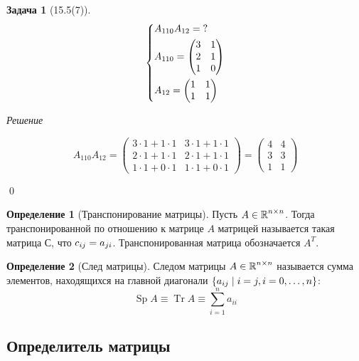 \documentclass[a4paper,12pt]{article}
\newtheorem*{problem}{Задача}
\theoremstyle{definition}
\newtheorem{definition}{Определение}[section]
\theoremstyle{remark}
\theoremstyle{remark}
\DeclareMathOperator{\Sp}{Sp}
\DeclareMathOperator{\Tr}{Tr}
\begin{document}
  \begin{problem}[15.5(7)]
    \[
      \left\{
        \begin{aligned}
          &A_{110} A_{12} = \operatorname{?}\\
          &A_{110} = \begin{pmatrix}
            3 & 1\\
            2 & 1\\
            1 & 0
          \end{pmatrix}\\
          &A_{12} = \begin{pmatrix}
            1 & 1\\
            1 & 1
          \end{pmatrix}
        \end{aligned}
      \right.
    \]
  \end{problem}
  
  \emph{Решение}
  
  \[
    A_{110} A_{12}
    = \begin{pmatrix}
      3 \cdot 1 + 1 \cdot 1 & 3 \cdot 1 + 1 \cdot 1\\
      2 \cdot 1 + 1 \cdot 1 & 2 \cdot 1 + 1 \cdot 1\\
      1 \cdot 1 + 0 \cdot 1 & 1 \cdot 1 + 0 \cdot 1
    \end{pmatrix}
    = \begin{pmatrix}
      4 & 4\\
      3 & 3\\
      1 & 1
    \end{pmatrix}
  \]
  
  \qed
  
  \begin{definition}[Транспонирование матрицы]
    Пусть $A \in \operatorname{\mathbb R}^{n \times n}$.
    Тогда транспонированной по отношению к матрице $A$ матрицей называется такая матрица $С$, что
    $c_{ij} \hm= a_{ji}$.
    Транспонированная матрица обозначается $A^T$.
  \end{definition}
  
  \begin{definition}[След матрицы]
    Следом матрицы $A \in \operatorname{\mathbb R}^{n \times n}$ называется сумма элементов, находящихся на главной диагонали $\{a_{ij} \hm\mid i = j, i = 0, \ldots, n\}$:
    \[
      \Sp A \equiv \Tr A \equiv \sum_{i = 1}^n a_{ii}
    \]
  \end{definition}


  \subsection{Определитель матрицы}
  
\end{document}
